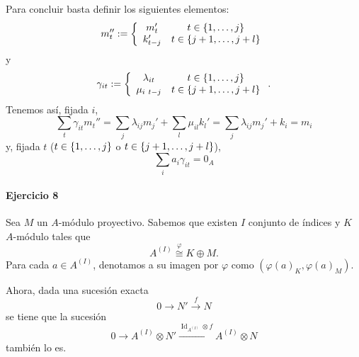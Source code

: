 \documentclass[../main.tex]{subfiles}
\begin{document}
Para concluir basta definir los siguientes elementos:
$$m_t'':=\left\{\begin{array}{cc}
    m_{t}'&t\in\{1,\dots,j\}  \\
    k_{t-j}'&t\in\{j+1,\dots,j+l\} 
\end{array}\right.$$
y
$$\gamma_{it}:=\left\{\begin{array}{cc}
    \lambda_{it}&t\in\{1,\dots,j\}  \\
    \mu_{i\ t-j}&t\in\{j+1,\dots,j+l\} 
\end{array}\right..$$
Tenemos así, fijada $i$,
$$\sum_t\gamma_{it}m_t''=\sum_{j}\lambda_{ij}m_j'+\sum_l\mu_{il}k_l'=\sum_{j}\lambda_{ij}m_j'+k_i= m_i$$
y, fijada $t$ ($t\in\{1,\dots,j\}$ o $t\in\{j+1,\dots,j+l\}$),
$$\sum_i a_i\gamma_{it}=0_A$$

\paragraph{Ejercicio 8} Sea $M$ un $A$-módulo proyectivo. Sabemos que existen $I$ conjunto de índices y $K$ $A$-módulo tales que
$$A^{(I)}\overset{\varphi}{\cong} K\oplus M.$$
Para cada $a\in A^{(I)}$, denotamos a su imagen por $\varphi$ como $(\varphi(a)_K,\varphi(a)_M)$.

Ahora, dada una sucesión exacta
$$0\longrightarrow N'\overset{f}{\longrightarrow}N$$
se tiene que la sucesión
$$0\longrightarrow A^{(I)}\otimes N'\overset{\operatorname{Id}_{A^{(I)}}\otimes f}{\longrightarrow} A^{(I)}\otimes N$$
también lo es. 
\end{document}
